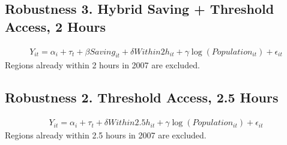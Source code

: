 \documentclass[a4paper, 10pt]{article}
\begin{document}
\begin{table}[H]
\centering
\caption{Robustness 2. Threshold Access, 2 Hours: 의사}

\end{table}

\subsection{Robustness 3. Hybrid Saving + Threshold Access, 2 Hours}
\begin{align*}
    Y_{it}=\alpha_i+\tau_t+\beta Saving_{it}+\delta Within2h_{it}+\gamma\log(Population_{it})+\epsilon_{it}
\end{align*}
Regions already within 2 hours in 2007 are excluded.
\begin{table}[H]
\centering
\caption{Robustness 3. Hybrid Saving + Threshold Access, 2 Hours: 의원}

\end{table}

\begin{table}[H]
\centering
\caption{Robustness 3. Hybrid Saving + Threshold Access, 2 Hours: 병원}

\end{table}

\begin{table}[H]
\centering
\caption{Robustness 3. Hybrid Saving + Threshold Access, 2 Hours: 종합병원}

\end{table}

\begin{table}[H]
\centering
\caption{Robustness 3. Hybrid Saving + Threshold Access, 2 Hours: 상급종합병원}

\end{table}

\begin{table}[H]
\centering
\caption{Robustness 3. Hybrid Saving + Threshold Access, 2 Hours: 의사}

\end{table}

\subsection{Robustness 2. Threshold Access, 2.5 Hours}
\begin{align*}
    Y_{it}=\alpha_i+\tau_t+\delta Within2.5h_{it}+\gamma\log(Population_{it})+\epsilon_{it}
\end{align*}
Regions already within 2.5 hours in 2007 are excluded.
\begin{table}[H]
\centering
\caption{Robustness 2. Threshold Access, 2.5 Hours: 의원}

\end{table}
\end{document}
